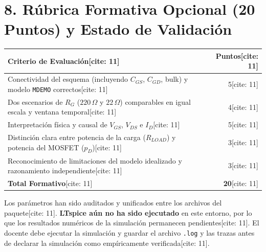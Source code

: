 \documentclass[11pt, a4paper]{article}
\begin{document}
\section*{8. Rúbrica Formativa Opcional (20 Puntos) y Estado de Validación}
\noindent
\begin{tabularx}{\textwidth}{@{} >{\raggedright\arraybackslash}X r @{}}
\toprule
\textbf{Criterio de Evaluación}[cite: 11] & \textbf{Puntos}[cite: 11] \\ \midrule
Conectividad del esquema (incluyendo $C_{GS}$, $C_{GD}$, bulk) y modelo \texttt{MDEMO} correctos[cite: 11] & 5[cite: 11] \\
Dos escenarios de $R_G$ ($220\,\Omega$ y $22\,\Omega$) comparables en igual escala y ventana temporal[cite: 11] & 4[cite: 11] \\
Interpretación física y causal de $V_{GS}$, $V_{DS}$ e $I_D$[cite: 11] & 5[cite: 11] \\
Distinción clara entre potencia de la carga ($R_{LOAD}$) y potencia del MOSFET ($p_D$)[cite: 11] & 3[cite: 11] \\
Reconocimiento de limitaciones del modelo idealizado y razonamiento independiente[cite: 11] & 3[cite: 11] \\ \midrule
\textbf{Total Formativo}[cite: 11] & \textbf{20}[cite: 11] \\ \bottomrule
\end{tabularx}

\vspace{0.3cm}
\begin{tcolorbox}[colback=red!5, colframe=red!75!black, title=\textbf{Estado de Validación del Paquete}]
    Los parámetros han sido auditados y unificados entre los archivos del paquete[cite: 11]. \textbf{LTspice aún no ha sido ejecutado} en este entorno, por lo que los resultados numéricos de la simulación permanecen pendientes[cite: 11]. El docente debe ejecutar la simulación y guardar el archivo \texttt{.log} y las trazas antes de declarar la simulación como empíricamente verificada[cite: 11].
\end{tcolorbox}
\end{document}
